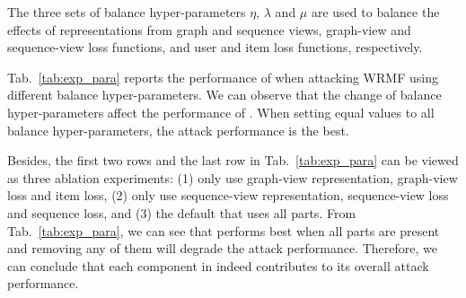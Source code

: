 The three sets of balance hyper-parameters $\eta$, $\lambda$ and $\mu$ are used to balance the effects of representations from graph and sequence views, graph-view and sequence-view loss functions, and user and item loss functions, respectively.

Tab.~\ref{tab:exp_para} reports the performance of \ours when attacking WRMF using different balance hyper-parameters.
We can observe that the change of balance hyper-parameters affect the performance of \ours.
When setting equal values to all balance hyper-parameters, the attack performance is the best. 

Besides, the first two rows and the last row in Tab.~\ref{tab:exp_para} can be viewed as three ablation experiments: (1) only use graph-view representation, graph-view loss and item loss, (2) only use sequence-view representation, sequence-view loss and sequence loss, and (3) the default \ours that uses all parts.
From Tab.~\ref{tab:exp_para}, we can see that \ours performs best when all parts are present and removing any of them will degrade the attack performance.
Therefore, we can conclude that each component in \ours indeed contributes to its overall attack performance.

